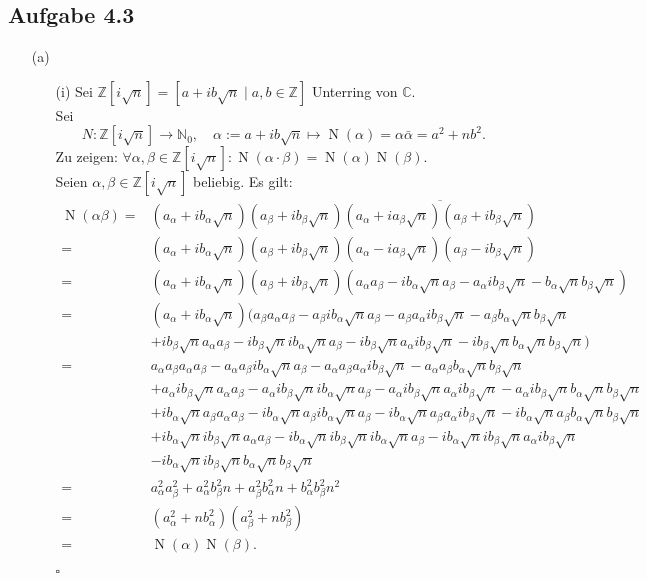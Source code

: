 \documentclass[12pt]{article}
\newcommand{\QED}{\begin{flushright} $\square$ \end{flushright}}
\newcommand{\N}{\operatorname{N}}
\newcommand{\aal}{a_{\alpha}}
\newcommand{\ab}{a_{\beta}}
\newcommand{\ba}{b_{\alpha}}
\newcommand{\bb}{b_{\beta}}
\begin{document}
\subsection*{Aufgabe 4.3}
\begin{enumerate}
	\item[(a)] 
	\begin{enumerate}
		\item[(i)] Sei $\mathbb{Z}[i\sqrt{n}]=\left\lbrack a+ib\sqrt{n}\mid a,b\in\mathbb{Z}\right\rbrack$ Unterring von $\mathbb{C}$. \\
		Sei $$N:\mathbb{Z}[i\sqrt{n}]\rightarrow\mathbb{N}_0, \quad
		\alpha:=a+ib\sqrt{n}\mapsto \N(\alpha)=\alpha\bar{\alpha}=a^2+nb^2.$$
		Zu zeigen: $\forall\alpha,\beta\in\mathbb{Z}[i\sqrt{n}]:\N(\alpha\cdot\beta)=\N(\alpha)\N(\beta).$ \\
		Seien $\alpha,\beta\in\mathbb{Z}[i\sqrt{n}]$ beliebig. Es gilt:
		\begin{align*}
			\N(\alpha\beta)=&(\aal+i\ba\sqrt{n})(\ab+i\bb\sqrt{n})\overline{(\aal+i\ab\sqrt{n})(\ab+i\bb\sqrt{n})} \\
			=&(\aal+i\ba\sqrt{n})(\ab+i\bb\sqrt{n})(\aal-i\ab\sqrt{n})(\ab-i\bb\sqrt{n}) \\
			=&(\aal+i\ba\sqrt{n})(\ab+i\bb\sqrt{n})(\aal\ab-i\ba\sqrt{n}\ab-\aal i\bb\sqrt{n}-\ba\sqrt{n}\bb\sqrt{n}) \\
			=&(\aal+i\ba\sqrt{n})(\ab\aal\ab-\ab i\ba\sqrt{n}\ab-\ab\aal i\bb\sqrt{n}-\ab\ba\sqrt{n}\bb\sqrt{n} \\
			&+i\bb\sqrt{n}\aal\ab-i\bb\sqrt{n}i\ba\sqrt{n}\ab-i\bb\sqrt{n}\aal i\bb\sqrt{n}-i\bb\sqrt{n}\ba\sqrt{n}\bb\sqrt{n}) \\
			=&\aal\ab\aal\ab-\aal\ab i\ba\sqrt{n}\ab-\aal\ab\aal i\bb\sqrt{n}-\aal\ab\ba\sqrt{n}\bb\sqrt{n} \\
			&+\aal i\bb\sqrt{n}\aal\ab-\aal i\bb\sqrt{n}i\ba\sqrt{n}\ab-\aal i\bb\sqrt{n}\aal i\bb\sqrt{n}-\aal i\bb\sqrt{n}\ba\sqrt{n}\bb\sqrt{n} \\		
			&+i\ba\sqrt{n}\ab\aal\ab-i\ba\sqrt{n}\ab i\ba\sqrt{n}\ab-i\ba\sqrt{n}\ab\aal i\bb\sqrt{n}-i\ba\sqrt{n}\ab\ba\sqrt{n}\bb\sqrt{n} \\
			&+i\ba\sqrt{n}i\bb\sqrt{n}\aal\ab-i\ba\sqrt{n}i\bb\sqrt{n}i\ba\sqrt{n}\ab-i\ba\sqrt{n}i\bb\sqrt{n}\aal i\bb\sqrt{n} \\
			&-i\ba\sqrt{n}i\bb\sqrt{n}\ba\sqrt{n}\bb\sqrt{n} \\
			=&\aal^2\ab^2+\aal^2\bb^2n+\ab^2\ba^2n+\ba^2\bb^2n^2 \\
			=&(\aal^2+n\ba^2)(\ab^2+n\bb^2) \\
			=&\N(\alpha)\N(\beta).
		\end{align*}
		\QED
		

\end{enumerate}
\end{enumerate}
\end{document}
